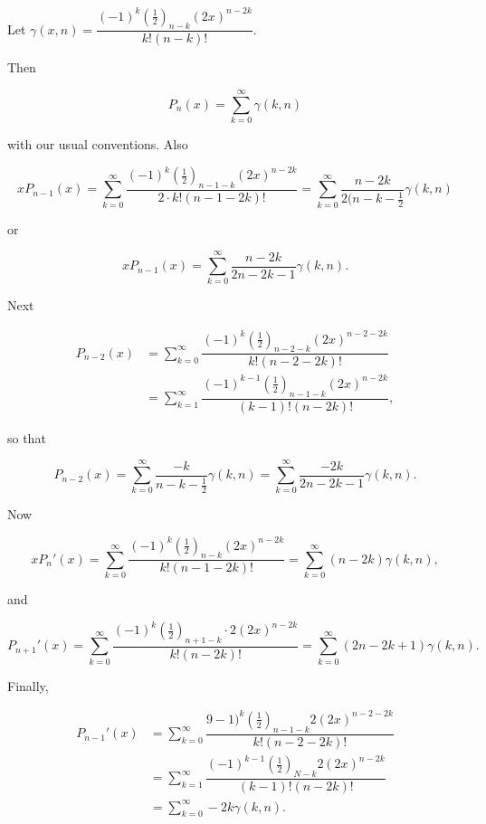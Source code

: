 \begin{solution}
Let $\gamma(x,n) = \dfrac{(-1)^k (\frac{1}{2})_{n-k} (2x)^{n-2k}}{k! (n-k)!}.$

Then

$$P_n(x) = \displaystyle\sum_{k=0}^{\infty} \gamma(k,n)$$

with our usual conventions. Also

$$x P_{n-1}(x) = \displaystyle\sum_{k=0}^{\infty} \dfrac{(-1)^k (\frac{1}{2})_{n-1-k}(2x)^{n-2k}}{2 \cdot k! (n-1-2k)!} = \displaystyle\sum_{k=0}^{\infty} \dfrac{n-2k}{2(n-k-\frac{1}{2}} \gamma(k,n)$$

or

$$x P_{n-1}(x) = \displaystyle\sum_{k=0}^{\infty} \dfrac{n-2k}{2n-2k-1} \gamma(k,n).$$

Next

$$\begin{array}{ll}
P_{n-2}(x) &= \displaystyle\sum_{k=0}^{\infty} \dfrac{(-1)^k (\frac{1}{2})_{n-2-k} (2x)^{n-2-2k}}{k! (n-2-2k)!} \\
&= \displaystyle\sum_{k=1}^{\infty} \dfrac{(-1)^{k-1} (\frac{1}{2})_{n-1-k} (2x)^{n-2k}}{(k-1)! (n-2k)!},
\end{array}$$

so that 

$$P_{n-2}(x) = \displaystyle\sum_{k=0}^{\infty} \dfrac{-k}{n-k-\frac{1}{2}} \gamma(k,n) = \displaystyle\sum_{k=0}^{\infty} \dfrac{-2k}{2n-2k-1} \gamma(k,n).$$

Now

$$x P_n'(x) = \displaystyle\sum_{k=0}^{\infty} \dfrac{(-1)^k (\frac{1}{2})_{n-k} (2x)^{n-2k}}{k! (n-1-2k)!} = \displaystyle\sum_{k=0}^{\infty} (n-2k)\gamma(k,n),$$

and

$$P_{n+1}'(x) = \displaystyle\sum_{k=0}^{\infty} \dfrac{(-1)^k (\frac{1}{2})_{n+1-k} \cdot 2 (2x)^{n-2k}}{k! (n-2k)!} = \displaystyle\sum_{k=0}^{\infty} (2n-2k+1) \gamma(k,n).$$

Finally,

$$\begin{array}{ll}
P_{n-1}'(x) &= \displaystyle\sum_{k=0}^{\infty} \dfrac{9-1)^k (\frac{1}{2})_{n-1-k} 2 (2x)^{n-2-2k}}{k! (n-2-2k)!} \\
&= \displaystyle\sum_{k=1}^{\infty} \dfrac{(-1)^{k-1} (\frac{1}{2})_{N-k} 2 (2x)^{n-2k}}{(k-1)! (n-2k)!} \\
&= \displaystyle\sum_{k=0}^{\infty} -2k \gamma(k,n).
\end{array}$$
\end{solution}
